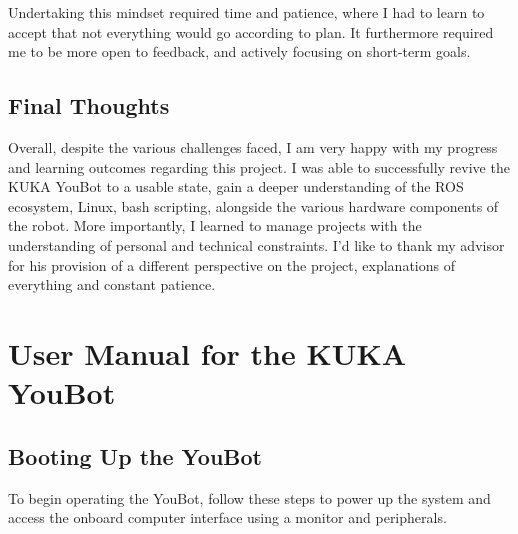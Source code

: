 \documentclass[a4paper, 12pt]{article}
\begin{document}
    Undertaking this mindset required time and patience, where I had to learn to accept that not everything would go according to plan. It furthermore required me to be more open to feedback, and actively focusing on short-term goals. 

    \subsection{Final Thoughts}

    Overall, despite the various challenges faced, I am very happy with my progress and learning outcomes regarding this project. I was able to successfully revive the KUKA YouBot to a usable state, gain a deeper understanding of the ROS ecosystem, Linux, bash scripting, alongside the various hardware components of the robot. More importantly, I learned to manage projects with the understanding of personal and technical constraints. I'd like to thank my advisor for his provision of a different perspective on the project, explanations of everything and constant patience.  


    \newpage

    \printbibliography

    \newpage

    \appendix


    \section{User Manual for the KUKA YouBot}

    \subsection{Booting Up the YouBot}
    To begin operating the YouBot, follow these steps to power up the system and access the onboard computer interface using a monitor and peripherals. 
\end{document}
